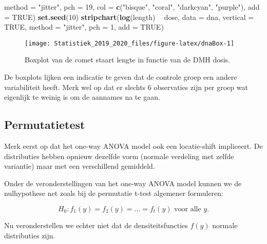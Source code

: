 \documentclass[12pt,dutch,coursenotes]{book}
\newenvironment{Shaded}{\begin{snugshade}}{\end{snugshade}}
\newcommand{\KeywordTok}[1]{\textcolor[rgb]{0.13,0.29,0.53}{\textbf{#1}}}
\newcommand{\DataTypeTok}[1]{\textcolor[rgb]{0.13,0.29,0.53}{#1}}
\newcommand{\DecValTok}[1]{\textcolor[rgb]{0.00,0.00,0.81}{#1}}
\newcommand{\StringTok}[1]{\textcolor[rgb]{0.31,0.60,0.02}{#1}}
\newcommand{\OtherTok}[1]{\textcolor[rgb]{0.56,0.35,0.01}{#1}}
\newcommand{\OperatorTok}[1]{\textcolor[rgb]{0.81,0.36,0.00}{\textbf{#1}}}
\newcommand{\NormalTok}[1]{#1}
\theoremstyle{definition}
\theoremstyle{definition}
\theoremstyle{definition}
\theoremstyle{remark}
\begin{document}
\begin{Shaded}
\begin{Highlighting}[]
    \DataTypeTok{method =} \StringTok{"jitter"}\NormalTok{, }\DataTypeTok{pch =} \DecValTok{19}\NormalTok{, }\DataTypeTok{col =} \KeywordTok{c}\NormalTok{(}\StringTok{"bisque"}\NormalTok{, }
        \StringTok{"coral"}\NormalTok{, }\StringTok{"darkcyan"}\NormalTok{, }\StringTok{"purple"}\NormalTok{), }\DataTypeTok{add =} \OtherTok{TRUE}\NormalTok{)}
\KeywordTok{set.seed}\NormalTok{(}\DecValTok{10}\NormalTok{)}
\KeywordTok{stripchart}\NormalTok{(}\KeywordTok{log}\NormalTok{(length) }\OperatorTok{~}\StringTok{ }\NormalTok{dose, }\DataTypeTok{data =}\NormalTok{ dna, }\DataTypeTok{vertical =} \OtherTok{TRUE}\NormalTok{, }
    \DataTypeTok{method =} \StringTok{"jitter"}\NormalTok{, }\DataTypeTok{pch =} \DecValTok{1}\NormalTok{, }\DataTypeTok{add =} \OtherTok{TRUE}\NormalTok{)}
\end{Highlighting}
\end{Shaded}

\begin{figure}

{\centering \texttt{[image: Statistiek\_2019\_2020\_files/figure-latex/dnaBox-1]} 

}

\caption{Boxplot van de comet staart lengte in functie van de DMH dosis.}\label{fig:dnaBox}
\end{figure}

De boxplots lijken een indicatie te geven dat de controle groep een
andere variabiliteit heeft. Merk wel op dat er slechts 6 observaties
zijn per groep wat eigenlijk te weinig is om de aannames na te gaan.

\subsection{Permutatietest}\label{permutatietest}

Merk eerst op dat het one-way ANOVA model ook een locatie-shift
impliceert. De distributies hebben opnieuw dezelfde vorm (normale
verdeling met zelfde variantie) maar met een verschillend gemiddeld.

Onder de veronderstellingen van het one-way ANOVA model kunnen we de
nulhypothese net zoals bij de permutatie t-test algemener formuleren:

\begin{equation*}
   H_0: f_1(y)=f_2(y) = \ldots = f_t(y) \text{ voor alle } y.
  \end{equation*}

Nu veronderstellen we echter niet dat de densiteitsfuncties \(f(y)\)
normale distributies zijn.
\end{document}
